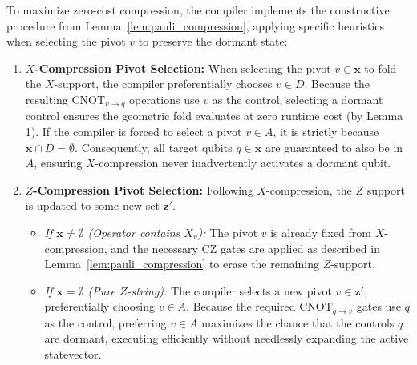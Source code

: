 \documentclass[11pt]{article}
\begin{document}
To maximize zero-cost compression, the compiler implements the constructive procedure from Lemma~\ref{lem:pauli_compression}, applying specific heuristics when selecting the pivot $v$ to preserve the dormant state:
\begin{enumerate}
    \item \textbf{$X$-Compression Pivot Selection:} When selecting the pivot $v \in \mathbf{x}$ to fold the $X$-support, the compiler preferentially chooses $v \in D$. Because the resulting $\text{CNOT}_{v \to q}$ operations use $v$ as the control, selecting a dormant control ensures the geometric fold evaluates at zero runtime cost (by Lemma 1). If the compiler is forced to select a pivot $v \in A$, it is strictly because $\mathbf{x} \cap D = \emptyset$. Consequently, all target qubits $q \in \mathbf{x}$ are guaranteed to also be in $A$, ensuring $X$-compression never inadvertently activates a dormant qubit.
    \item \textbf{$Z$-Compression Pivot Selection:} Following $X$-compression, the $Z$ support is updated to some new set $\mathbf{z}'$.
    \begin{itemize}
        \item \textit{If $\mathbf{x} \neq \emptyset$ (Operator contains $X_v$):} The pivot $v$ is already fixed from $X$-compression, and the necessary $\text{CZ}$ gates are applied as described in Lemma~\ref{lem:pauli_compression} to erase the remaining $Z$-support.
        \item \textit{If $\mathbf{x} = \emptyset$ (Pure $Z$-string):} The compiler selects a new pivot $v \in \mathbf{z}'$, preferentially choosing $v \in A$. Because the required $\text{CNOT}_{q \to v}$ gates use $q$ as the control, preferring $v \in A$ maximizes the chance that the controls $q$ are dormant, executing efficiently without needlessly expanding the active statevector.
    \end{itemize}
\end{enumerate}
\end{document}

